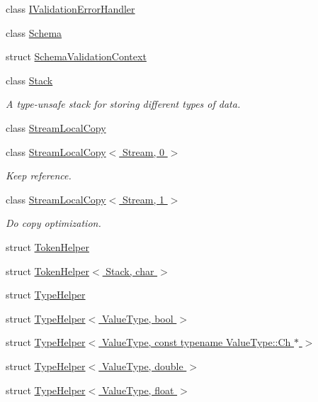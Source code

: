 \begin{DoxyCompactItemize}
\item 
class \hyperlink{classinternal_1_1IValidationErrorHandler}{I\+Validation\+Error\+Handler}
\item 
class \hyperlink{classinternal_1_1Schema}{Schema}
\item 
struct \hyperlink{structinternal_1_1SchemaValidationContext}{Schema\+Validation\+Context}
\item 
class \hyperlink{classinternal_1_1Stack}{Stack}
\begin{DoxyCompactList}\small\item\em A type-\/unsafe stack for storing different types of data. \end{DoxyCompactList}\item 
class \hyperlink{classinternal_1_1StreamLocalCopy}{Stream\+Local\+Copy}
\item 
class \hyperlink{classinternal_1_1StreamLocalCopy_3_01Stream_00_010_01_4}{Stream\+Local\+Copy$<$ Stream, 0 $>$}
\begin{DoxyCompactList}\small\item\em Keep reference. \end{DoxyCompactList}\item 
class \hyperlink{classinternal_1_1StreamLocalCopy_3_01Stream_00_011_01_4}{Stream\+Local\+Copy$<$ Stream, 1 $>$}
\begin{DoxyCompactList}\small\item\em Do copy optimization. \end{DoxyCompactList}\item 
struct \hyperlink{structinternal_1_1TokenHelper}{Token\+Helper}
\item 
struct \hyperlink{structinternal_1_1TokenHelper_3_01Stack_00_01char_01_4}{Token\+Helper$<$ Stack, char $>$}
\item 
struct \hyperlink{structinternal_1_1TypeHelper}{Type\+Helper}
\item 
struct \hyperlink{structinternal_1_1TypeHelper_3_01ValueType_00_01bool_01_4}{Type\+Helper$<$ Value\+Type, bool $>$}
\item 
struct \hyperlink{structinternal_1_1TypeHelper_3_01ValueType_00_01const_01typename_01ValueType_1_1Ch_01_5_01_4}{Type\+Helper$<$ Value\+Type, const typename Value\+Type\+::\+Ch $\ast$ $>$}
\item 
struct \hyperlink{structinternal_1_1TypeHelper_3_01ValueType_00_01double_01_4}{Type\+Helper$<$ Value\+Type, double $>$}
\item 
struct \hyperlink{structinternal_1_1TypeHelper_3_01ValueType_00_01float_01_4}{Type\+Helper$<$ Value\+Type, float $>$}

\end{DoxyCompactItemize}
